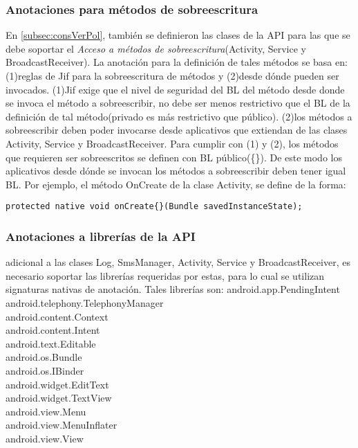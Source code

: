 \subsubsection{Anotaciones para métodos de sobreescritura}
En \ref{subsec:consVerPol},
también se definieron las clases de la API para las que se debe soportar el
\textit{Acceso a métodos de sobreescritura}(Activity, Service y
BroadcastReceiver). La anotación para la definición de tales métodos se basa en:
(1)reglas de Jif para la sobreescritura de métodos y (2)desde dónde pueden ser
invocados. (1)Jif exige que el nivel de seguridad del BL del método desde donde
se invoca el método a sobreescribir, no debe ser menos restrictivo que el BL de
la definición de tal método(privado es más restrictivo que público).
(2)los métodos a sobreescribir deben poder invocarse desde aplicativos que
extiendan de las clases Activity, Service y BroadcastReceiver.\newline 
Para cumplir con (1) y (2), los métodos que requieren ser sobreescritos se
definen con BL público(\{\}). De este modo los aplicativos desde dónde se
invocan los métodos a sobreescribir deben tener igual BL.\newline 
Por ejemplo, el método OnCreate de la clase Activity, se define de la forma:
\begin{lstlisting}
protected native void onCreate{}(Bundle savedInstanceState);
\end{lstlisting}


\subsubsection{Anotaciones a librerías de la API}
adicional a las clases Log, SmsManager, Activity, Service y
BroadcastReceiver, es necesario soportar las librerías requeridas por estas,
para lo cual se utilizan signaturas nativas de anotación. Tales librerías
son:\newline 
android.app.PendingIntent\\
android.telephony.TelephonyManager\\
android.content.Context\\
android.content.Intent\\
android.text.Editable\\
android.os.Bundle\\
android.os.IBinder\\
android.widget.EditText\\
android.widget.TextView\\ 
android.view.Menu\\
android.view.MenuInflater\\
android.view.View 


